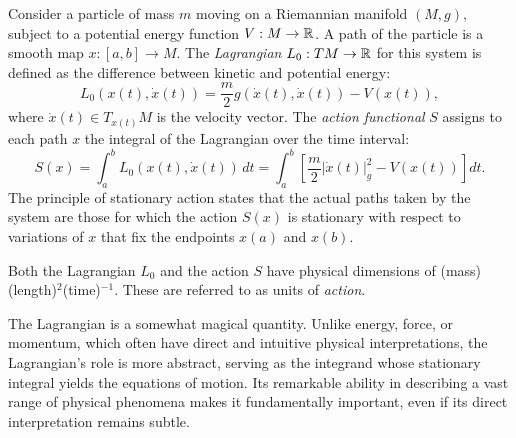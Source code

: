 Consider a particle of mass $m$ moving on a Riemannian manifold $(M,g)$, subject to a potential energy function $V: M \to \mathbb{R}$. A path of the particle is a smooth map $x: [a,b] \to M$. The \textit{Lagrangian} $L_0: TM \to \mathbb{R}$ for this system is defined as the difference between kinetic and potential energy:
\begin{equation}
    L_0(x(t), \dot{x}(t)) = \frac{m}{2} g(\dot{x}(t), \dot{x}(t)) - V(x(t)),
\end{equation}
where $\dot{x}(t) \in T_{x(t)}M$ is the velocity vector. The \textit{action functional} $S$ assigns to each path $x$ the integral of the Lagrangian over the time interval:
\begin{equation}
\label{eq:action_functional}
    S(x) = \int_a^b L_0(x(t), \dot{x}(t)) \, dt = \int_a^b \left[ \frac{m}{2} |\dot{x}(t)|_g^2 - V(x(t)) \right] dt.
\end{equation}
The principle of stationary action states that the actual paths taken by the system are those for which the action $S(x)$ is stationary with respect to variations of $x$ that fix the endpoints $x(a)$ and $x(b)$.

Both the Lagrangian $L_0$ and the action $S$ have physical dimensions of (mass)(length)$^2$(time)$^{-1}$. These are referred to as units of \textit{action}.

\begin{remark}
\label{rem:nature_lagrangian}
The Lagrangian is a somewhat magical quantity. Unlike energy, force, or momentum, which often have direct and intuitive physical interpretations, the Lagrangian's role is more abstract, serving as the integrand whose stationary integral yields the equations of motion. Its remarkable ability in describing a vast range of physical phenomena makes it fundamentally important, even if its direct interpretation remains subtle.
\end{remark}

